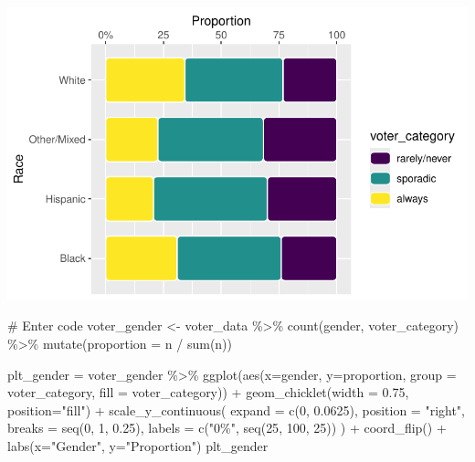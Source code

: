 \documentclass[
  letterpaper,
  DIV=11,
  numbers=noendperiod]{scrartcl}
\newenvironment{Shaded}{\begin{snugshade}}{\end{snugshade}}
\newcommand{\AttributeTok}[1]{\textcolor[rgb]{0.40,0.45,0.13}{#1}}
\newcommand{\CommentTok}[1]{\textcolor[rgb]{0.37,0.37,0.37}{#1}}
\newcommand{\DecValTok}[1]{\textcolor[rgb]{0.68,0.00,0.00}{#1}}
\newcommand{\FloatTok}[1]{\textcolor[rgb]{0.68,0.00,0.00}{#1}}
\newcommand{\FunctionTok}[1]{\textcolor[rgb]{0.28,0.35,0.67}{#1}}
\newcommand{\NormalTok}[1]{\textcolor[rgb]{0.00,0.23,0.31}{#1}}
\newcommand{\OtherTok}[1]{\textcolor[rgb]{0.00,0.23,0.31}{#1}}
\newcommand{\SpecialCharTok}[1]{\textcolor[rgb]{0.37,0.37,0.37}{#1}}
\newcommand{\StringTok}[1]{\textcolor[rgb]{0.13,0.47,0.30}{#1}}
\begin{document}
\includegraphics{Lab4_multinom_Questions-1_files/figure-pdf/unnamed-chunk-6-1.pdf}

\begin{Shaded}
\begin{Highlighting}[]
\CommentTok{\# Enter code}
\NormalTok{voter\_gender }\OtherTok{\textless{}{-}}\NormalTok{ voter\_data }\SpecialCharTok{\%\textgreater{}\%}
  \FunctionTok{count}\NormalTok{(gender, voter\_category) }\SpecialCharTok{\%\textgreater{}\%}
  \FunctionTok{mutate}\NormalTok{(}\AttributeTok{proportion =}\NormalTok{ n }\SpecialCharTok{/} \FunctionTok{sum}\NormalTok{(n))}

\NormalTok{plt\_gender }\OtherTok{=}\NormalTok{ voter\_gender }\SpecialCharTok{\%\textgreater{}\%}
  \FunctionTok{ggplot}\NormalTok{(}\FunctionTok{aes}\NormalTok{(}\AttributeTok{x=}\NormalTok{gender, }\AttributeTok{y=}\NormalTok{proportion, }\AttributeTok{group =}\NormalTok{ voter\_category, }\AttributeTok{fill =}\NormalTok{ voter\_category)) }\SpecialCharTok{+}
  \FunctionTok{geom\_chicklet}\NormalTok{(}\AttributeTok{width =} \FloatTok{0.75}\NormalTok{, }\AttributeTok{position=}\StringTok{"fill"}\NormalTok{)  }\SpecialCharTok{+} 
  \FunctionTok{scale\_y\_continuous}\NormalTok{(}
    \AttributeTok{expand =} \FunctionTok{c}\NormalTok{(}\DecValTok{0}\NormalTok{, }\FloatTok{0.0625}\NormalTok{),}
    \AttributeTok{position =} \StringTok{"right"}\NormalTok{,}
    \AttributeTok{breaks =} \FunctionTok{seq}\NormalTok{(}\DecValTok{0}\NormalTok{, }\DecValTok{1}\NormalTok{, }\FloatTok{0.25}\NormalTok{),}
    \AttributeTok{labels =} \FunctionTok{c}\NormalTok{(}\StringTok{"0\%"}\NormalTok{, }\FunctionTok{seq}\NormalTok{(}\DecValTok{25}\NormalTok{, }\DecValTok{100}\NormalTok{, }\DecValTok{25}\NormalTok{))}
\NormalTok{  ) }\SpecialCharTok{+}
  \FunctionTok{coord\_flip}\NormalTok{() }\SpecialCharTok{+} 
  \FunctionTok{labs}\NormalTok{(}\AttributeTok{x=}\StringTok{"Gender"}\NormalTok{, }\AttributeTok{y=}\StringTok{"Proportion"}\NormalTok{)}
\NormalTok{plt\_gender}
\end{Highlighting}
\end{Shaded}
\end{document}
